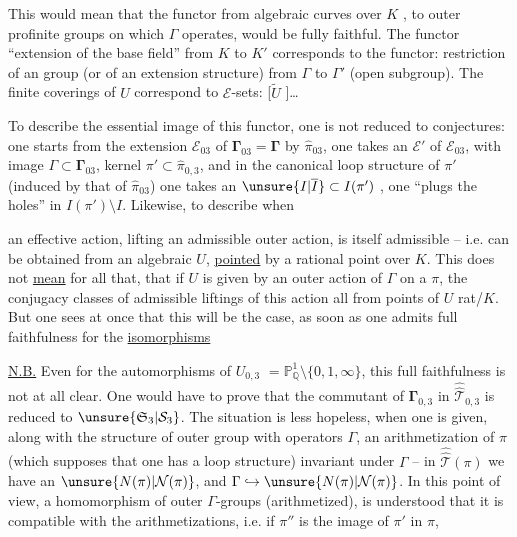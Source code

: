 This would mean that the functor from algebraic curves
over $K$ , to outer profinite groups
on which $\Gamma$ operates, would be fully faithful.
The functor ``extension of the base field'' from
$K$ to $K'$ corresponds to the functor: restriction
of an  group (or of an extension
structure) from $\Gamma$ to $\Gamma'$ (open subgroup).
The finite  coverings of $U$ correspond to
$\mathcal E$-sets: [$\widetilde U$ ]\ldots

To describe the essential image of this
functor, one is not reduced to conjectures:
one starts from the  extension $\mathcal E_{03}$ of $\boldsymbol{\Gamma}_{03}=\boldsymbol{\Gamma}$
by $\widehat{\pi}_{03}$, one takes an   $\mathcal E'$
of $\mathcal E_{03}$, with image $\Gamma\subset\boldsymbol{\Gamma}_{03}$, kernel
$\pi'\subset\widehat{\pi}_{0,3}$, and in the canonical
loop structure of $\pi'$  (induced by that of $\widehat{\pi}_{03}$)
one takes an $\unsure{I|\overline I}\subset I(\pi')$ ,  one ``plugs the holes''
in $I(\pi')\setminus I$. Likewise, to describe when

an effective action, lifting an admissible outer
action, is itself admissible -- 
i.e. can be obtained from an algebraic 
$U$, \uline{pointed} by a rational point over $K$.
This does not \uline{mean} for all that, that if
$U$ is given by an outer action of $\Gamma$ on a $\pi$,
the conjugacy classes of admissible liftings
of this action all  from
points of $U$ rat/$K$. But one sees at once that
this will be the case, as soon as one admits
full faithfulness for the \uline{isomorphisms}

\uline{N.B.} Even for the automorphisms of $U_{0,3}$
$=\mathbb P^1_{\mathbb Q}\setminus\{0,1,\infty\}$, this full faithfulness is not
at all clear. One would have to prove that 
the commutant of $\boldsymbol{\Gamma}_{0,3}$ in $\widehat{\widehat{\mathcal T}}_{0,3}$ is reduced
to $\unsure{\mathfrak S_3|\mathcal S_3}$. The situation is less hopeless,
when one is given, along with the structure of
outer  group with operators $\Gamma$, an arithmetization
of $\pi$ (which supposes that one has 
a loop structure) invariant under  $\Gamma$
--  in $\widehat{\widehat{\mathcal T}}(\pi)$ we have an $\unsure{N(\pi)|\mathcal N(\pi)}$,
and $\Gamma\hookrightarrow\unsure{N(\pi)|\mathcal N(\pi)}$. In this point of view,  a
homomorphism  of outer $\Gamma$-groups (arithmetized),
 is understood that it is compatible with
the arithmetizations, i.e. if $\pi''$ is the image of $\pi'$ in $\pi$,

